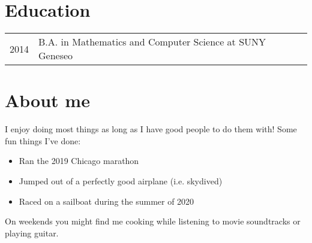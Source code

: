 \documentclass[a4paper,10pt]{article}
\begin{document}
\section{Education}
\begin{tabular}{rl}
  \textsc{2014} & B.A. in Mathematics and Computer Science at SUNY Geneseo
\end{tabular}

\section{About me}
I enjoy doing most things as long as I have good people to do them with! Some fun things I've done:
\begin{itemize}
  \item Ran the 2019 Chicago marathon
  \item Jumped out of a perfectly good airplane (i.e. skydived)
  \item Raced on a sailboat during the summer of 2020
\end{itemize}

On weekends you might find me cooking while listening to movie soundtracks or playing guitar.
\end{document}
